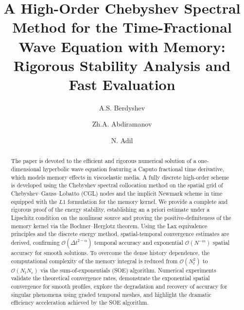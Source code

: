 \documentclass[a4paper,fleqn]{cas-sc}
\begin{document}
\let\WriteBookmarks\relax
\def\floatpagepagefraction{1}
\def\textpagefraction{.001}


\title [mode = title]{A High-Order Chebyshev Spectral Method for the Time-Fractional Wave Equation with Memory: Rigorous Stability Analysis and Fast Evaluation}

\author[1,2]{A.S. Berdyshev}

\author[1,2]{Zh.A. Abdiramanov}
\cormark[1]

\author[1]{N. Adil}

\address[1]{Department of Mathematics and Mathematical Modelling, Faculty of Mathematics, Physics and Informatics, Abai Kazakh National Pedagogical University, Almaty 050010, Kazakhstan}
\address[2]{Institute of Information and Computational Technologies, Science Committee of the Ministry of Science and Higher Education, Almaty 050010, Kazakhstan}


\begin{abstract}
The paper is devoted to the efficient and rigorous numerical solution of a one-dimensional hyperbolic wave equation featuring a Caputo fractional time derivative, which models memory effects in viscoelastic media. A fully discrete high-order scheme is developed using the Chebyshev spectral collocation method on the spatial grid of Chebyshev--Gauss--Lobatto (CGL) nodes and the implicit Newmark scheme in time equipped with the $L1$ formulation for the memory kernel. We provide a complete and rigorous proof of the energy stability, establishing an a priori estimate under a Lipschitz condition on the nonlinear source and proving the positive-definiteness of the memory kernel via the Bochner--Herglotz theorem. Using the Lax equivalence principles and the discrete energy method, spatial-temporal convergence estimates are derived, confirming $\mathcal{O}(\Delta t^{2-\alpha})$ temporal accuracy and exponential $\mathcal{O}(N^{-m})$ spatial accuracy for smooth solutions. To overcome the dense history dependence, the computational complexity of the memory integral is reduced from $\mathcal{O}(N_t^2)$ to $\mathcal{O}(N_t N_e)$ via the sum-of-exponentials (SOE) algorithm. Numerical experiments validate the theoretical convergence rates, demonstrate the exponential spatial convergence for smooth profiles, explore the degradation and recovery of accuracy for singular phenomena using graded temporal meshes, and highlight the dramatic efficiency acceleration achieved by the SOE algorithm.
\end{abstract}
\end{document}

